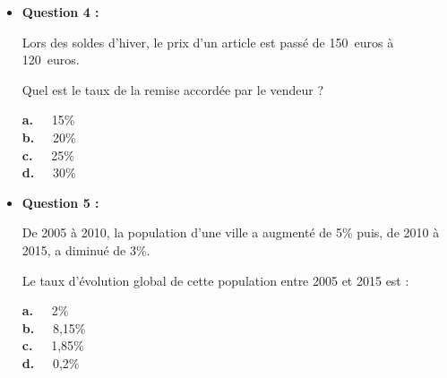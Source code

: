 \begin{itemize}
     \par
     \item \textbf{Question 4 :}
     \par
     Lors des soldes d'hiver, le prix d'un article est passé de 150~euros à 120~euros.
     \par
     Quel est le taux de la remise accordée par le vendeur ?
     \par
     \textbf{a.~~} 15\% \\
     \textbf{b.~~} 20\%  \\
     \textbf{c.~~} 25\% \\
     \textbf{d.~~} 30\% \\
     \par
     \item \textbf{Question 5 :}
     \par
     De 2005 à 2010, la population d'une ville a augmenté de 5\% puis, de 2010 à 2015, a diminué de 3\%.
     \par
     Le taux d'évolution global de cette population entre 2005 et 2015 est :
     \par
     \textbf{a.~~} 2\% \\
     \textbf{b.~~} 8,15\%  \\
     \textbf{c.~~} 1,85\% \\
     \textbf{d.~~} 0,2\% \\
     \par
\end{itemize}
